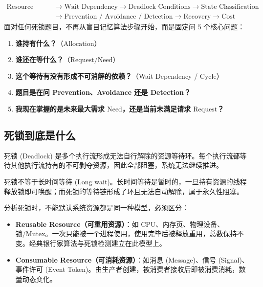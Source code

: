 \documentclass[11pt,a4paper]{ctexart}
\newcommand{\kw}[1]{\textbf{#1}}
\begin{document}
\begin{corebox}[死锁分析核心控制流]
\[
\boxed{
\begin{aligned}
\text{Resource State} &\to \text{Wait Dependency} \to \text{Deadlock Conditions} \to \text{State Classification} \\
&\to \text{Prevention / Avoidance / Detection} \to \text{Recovery} \to \text{Cost}
\end{aligned}
}
\]
面对任何死锁题目，不再从盲目记忆算法步骤开始，而是固定问 5 个核心问题：
\begin{enumerate}
\item \kw{谁持有什么？}（$\text{Allocation}$）
\item \kw{谁还在等什么？}（$\text{Request} / \text{Need}$）
\item \kw{这个等待有没有形成不可消解的依赖？}（Wait Dependency / Cycle）
\item \kw{题目是在问 Prevention、Avoidance 还是 Detection？}
\item \kw{我现在掌握的是未来最大需求 $\text{Need}$，还是当前未满足请求 $\text{Request}$？}
\end{enumerate}
\end{corebox}

\subsection{死锁到底是什么}

死锁 (Deadlock) 是多个执行流形成无法自行解除的资源等待环。每个执行流都等待其他执行流持有的不可剥夺资源，因此全部阻塞，系统无法继续推进。

死锁不等于长时间等待 (Long wait)。长时间等待是暂时的，一旦持有资源的线程释放锁即可唤醒；而死锁的等待链形成了环且无法自动解除，属于永久性阻塞。

\begin{method}
分析死锁时，不能默认系统资源都是同一种模型，必须区分：
\begin{itemize}
  \item \kw{Reusable Resource（可重用资源）}：如 CPU、内存页、物理设备、锁/Mutex。一次只能被一个进程使用，使用完毕后被释放重用，总数保持不变。经典银行家算法与死锁检测建立在此模型上。
  \item \kw{Consumable Resource（可消耗资源）}：如消息 (Message)、信号 (Signal)、事件许可 (Event Token)。由生产者创建，被消费者接收后即被消费消耗，数量动态变化。
\end{itemize}
\end{method}
\end{document}
